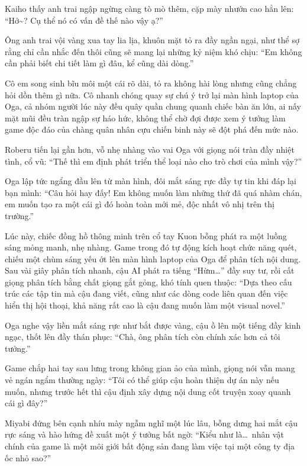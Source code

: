 \documentclass[../main.tex]{subfiles}
\begin{document}
Kaiho thấy anh trai ngập ngừng càng tò mò thêm, cặp mày nhướn cao hẳn lên: ``Hở\~{}? Cụ thể nó có vấn đề thế nào vậy ạ?''

Ông anh trai vội vàng xua tay lia lịa, khuôn mặt tỏ ra đầy ngần ngại, như thể sợ rằng chỉ cần nhắc đến thôi cũng sẽ mang lại những kỷ niệm khó chịu: ``Em không cần phải biết chi tiết làm gì đâu, kể cũng dài dòng.''

Cô em song sinh bĩu môi một cái rõ dài, tỏ ra không hài lòng nhưng cũng chẳng hỏi dồn thêm gì nữa. Cô nhanh chóng quay sự chú ý trở lại màn hình laptop của Oga, cả nhóm người lúc này đều quây quần chung quanh chiếc bàn ăn lớn, ai nấy mặt mũi đều tràn ngập sự háo hức, không thể chờ đợi được xem ý tưởng làm game độc đáo của chàng quân nhân cựu chiến binh này sẽ đột phá đến mức nào.

Roberu tiến lại gần hơn, vỗ nhẹ nhàng vào vai Oga với giọng nói tràn đầy nhiệt tình, cổ vũ: ``Thế thì em định phát triển thể loại nào cho trò chơi của mình vậy?''

Oga lập tức ngẩng đầu lên từ màn hình, đôi mắt sáng rực đầy tự tin khi đáp lại bạn mình: ``Câu hỏi hay đấy! Em không muốn làm những thứ đã quá nhàm chán, em muốn tạo ra một cái gì đó hoàn toàn mới mẻ, độc nhất vô nhị trên thị trường.''

Lúc này, chiếc đồng hồ thông minh trên cổ tay Kuon bỗng phát ra một luồng sáng mỏng manh, nhẹ nhàng. Game trong đó tự động kích hoạt chức năng quét, chiếu một chùm sáng yếu ớt lên màn hình laptop của Oga để phân tích nội dung. Sau vài giây phân tích nhanh, cậu AI phát ra tiếng ``Hừm\dots'' đầy suy tư, rồi cất giọng phân tích bằng chất giọng gắt gỏng, khó tính quen thuộc: ``Dựa theo cấu trúc các tập tin mà cậu đang viết, cũng như các dòng code liên quan đến việc hiển thị hội thoại, khả năng rất cao là cậu đang muốn làm một visual novel.''

Oga nghe vậy liền mắt sáng rực như bắt được vàng, cậu ồ lên một tiếng đầy kinh ngạc, thốt lên đầy thán phục: ``Chà, ông phân tích còn chính xác hơn cả tôi tưởng.''

Game chắp hai tay sau lưng trong không gian ảo của mình, giọng nói vẫn mang vẻ ngán ngẩm thường ngày: ``Tôi có thể giúp cậu hoàn thiện dự án này nếu muốn, nhưng trước hết thì cậu định xây dựng nội dung cốt truyện xoay quanh cái gì đây?''

Miyabi đứng bên cạnh nhíu mày ngẫm nghĩ một lúc lâu, bỗng dưng hai mắt cậu rực sáng và hào hứng đề xuất một ý tưởng bất ngờ: ``Kiểu như là\dots\ nhân vật chính của game là một môi giới bất động sản đang làm việc tại một công ty địa ốc nhỏ sao?''
\end{document}
